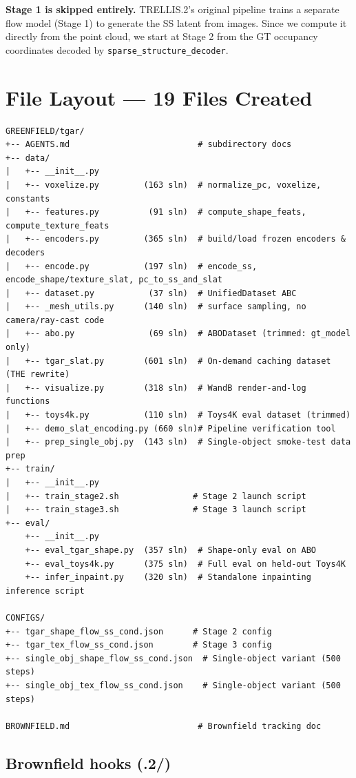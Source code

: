 \textbf{Stage 1 is skipped entirely.} TRELLIS.2's original pipeline trains a
separate flow model (Stage 1) to generate the SS latent from images. Since
we compute it directly from the point cloud, we start at Stage 2 from the
GT occupancy coordinates decoded by \texttt{sparse\_structure\_decoder}.

\section{File Layout --- 19 Files Created}

\begin{lstlisting}
GREENFIELD/tgar/
+-- AGENTS.md                          # subdirectory docs
+-- data/
|   +-- __init__.py
|   +-- voxelize.py         (163 sln)  # normalize_pc, voxelize, constants
|   +-- features.py          (91 sln)  # compute_shape_feats, compute_texture_feats
|   +-- encoders.py         (365 sln)  # build/load frozen encoders & decoders
|   +-- encode.py           (197 sln)  # encode_ss, encode_shape/texture_slat, pc_to_ss_and_slat
|   +-- dataset.py           (37 sln)  # UnifiedDataset ABC
|   +-- _mesh_utils.py      (140 sln)  # surface sampling, no camera/ray-cast code
|   +-- abo.py               (69 sln)  # ABODataset (trimmed: gt_model only)
|   +-- tgar_slat.py        (601 sln)  # On-demand caching dataset (THE rewrite)
|   +-- visualize.py        (318 sln)  # WandB render-and-log functions
|   +-- toys4k.py           (110 sln)  # Toys4K eval dataset (trimmed)
|   +-- demo_slat_encoding.py (660 sln)# Pipeline verification tool
|   +-- prep_single_obj.py  (143 sln)  # Single-object smoke-test data prep
+-- train/
|   +-- __init__.py
|   +-- train_stage2.sh               # Stage 2 launch script
|   +-- train_stage3.sh               # Stage 3 launch script
+-- eval/
    +-- __init__.py
    +-- eval_tgar_shape.py  (357 sln)  # Shape-only eval on ABO
    +-- eval_toys4k.py      (375 sln)  # Full eval on held-out Toys4K
    +-- infer_inpaint.py    (320 sln)  # Standalone inpainting inference script

CONFIGS/
+-- tgar_shape_flow_ss_cond.json      # Stage 2 config
+-- tgar_tex_flow_ss_cond.json        # Stage 3 config
+-- single_obj_shape_flow_ss_cond.json  # Single-object variant (500 steps)
+-- single_obj_tex_flow_ss_cond.json    # Single-object variant (500 steps)

BROWNFIELD.md                          # Brownfield tracking doc
\end{lstlisting}

\subsection{Brownfield hooks (\TRELLIS.2/)}


